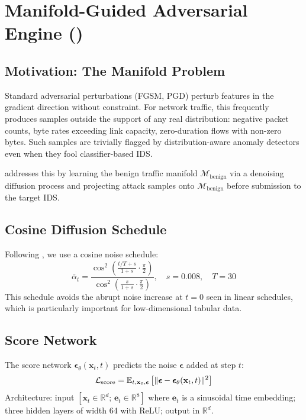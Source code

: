 \chapter{Manifold-Guided Adversarial Engine (\mgae{})}
\label{ch:mgae}

\section{Motivation: The Manifold Problem}

Standard adversarial perturbations (FGSM, PGD) perturb features in the
gradient direction without constraint. For network traffic, this
frequently produces samples outside the support of any real distribution:
negative packet counts, byte rates exceeding link capacity, zero-duration
flows with non-zero bytes. Such samples are trivially flagged by
distribution-aware anomaly detectors even when they fool classifier-based IDS.

\mgae{} addresses this by learning the benign traffic manifold
$\mathcal{M}_{\mathrm{benign}}$ via a denoising diffusion process
and projecting attack samples onto $\mathcal{M}_{\mathrm{benign}}$
before submission to the target IDS.

\section{Cosine Diffusion Schedule}

Following \cite{nichol2021}, we use a cosine noise schedule:
\begin{equation}
  \bar\alpha_t = \frac{\cos^2\!\left(\frac{t/T + s}{1+s}\cdot\frac{\pi}{2}\right)}
    {\cos^2\!\left(\frac{s}{1+s}\cdot\frac{\pi}{2}\right)},
  \quad s = 0.008,\quad T = 30
\end{equation}
This schedule avoids the abrupt noise increase at $t=0$ seen in linear
schedules, which is particularly important for low-dimensional tabular data.

\section{Score Network}

The score network $\boldsymbol\epsilon_\theta(\mathbf{x}_t, t)$ predicts
the noise $\boldsymbol\epsilon$ added at step $t$:
\begin{equation}
  \mathcal{L}_{\mathrm{score}} = \mathbb{E}_{t, \mathbf{x}_0, \boldsymbol\epsilon}
    \left[\|\boldsymbol\epsilon - \boldsymbol\epsilon_\theta(\mathbf{x}_t, t)\|^2\right]
\end{equation}
Architecture: input $[\mathbf{x}_t \in \mathbb{R}^d;\, \mathbf{e}_t \in \mathbb{R}^8]$
where $\mathbf{e}_t$ is a sinusoidal time embedding;
three hidden layers of width 64 with ReLU; output in $\mathbb{R}^d$.

